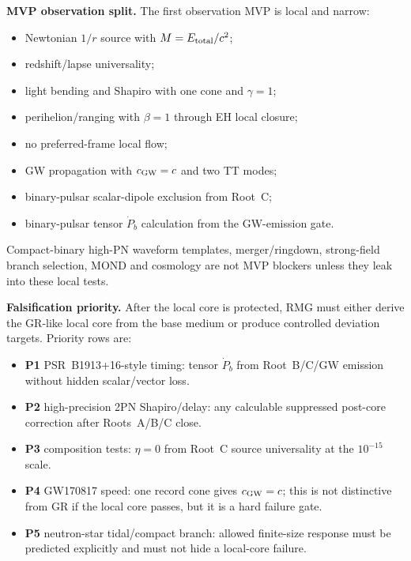 \documentclass[11pt]{article}
\begin{document}
\medskip\noindent\textbf{MVP observation split.}
The first observation MVP is local and narrow:
\begin{itemize}
\item Newtonian \(1/r\) source with \(M=E_{\rm total}/c^2\);
\item redshift/lapse universality;
\item light bending and Shapiro with one cone and \(\gamma=1\);
\item perihelion/ranging with \(\beta=1\) through EH local closure;
\item no preferred-frame local flow;
\item GW propagation with \(c_{\rm GW}=c\) and two TT modes;
\item binary-pulsar scalar-dipole exclusion from Root~C;
\item binary-pulsar tensor \(\dot P_b\) calculation from the GW-emission gate.
\end{itemize}
Compact-binary high-PN waveform templates, merger/ringdown, strong-field
branch selection, MOND and cosmology are not MVP blockers unless they leak
into these local tests.

\medskip\noindent\textbf{Falsification priority.}
After the local core is protected, RMG must either derive the GR-like local
core from the base medium or produce controlled deviation targets.  Priority
rows are:
\begin{itemize}
\item \textbf{P1} PSR~B1913+16-style timing: tensor \(\dot P_b\) from
  Root~B/C/GW emission without hidden scalar/vector loss.
\item \textbf{P2} high-precision 2PN Shapiro/delay: any calculable suppressed
  post-core correction after Roots~A/B/C close.
\item \textbf{P3} composition tests: \(\eta=0\) from Root~C source
  universality at the \(10^{-15}\) scale.
\item \textbf{P4} GW170817 speed: one record cone gives \(c_{\rm GW}=c\);
  this is not distinctive from GR if the local core passes, but it is a hard
  failure gate.
\item \textbf{P5} neutron-star tidal/compact branch: allowed finite-size
  response must be predicted explicitly and must not hide a local-core
  failure.
\end{itemize}
\end{document}
